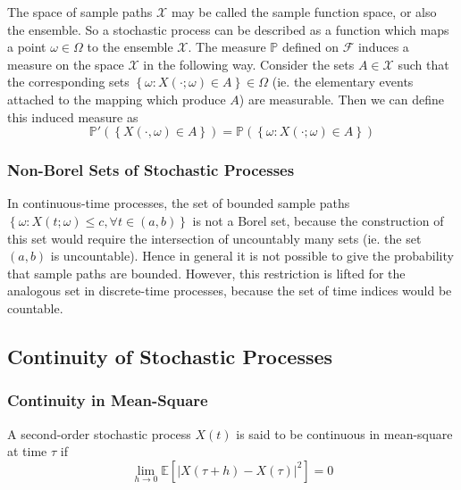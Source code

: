 \documentclass[11pt]{report} %
\begin{document}
The space of sample paths $\mathcal{X}$ may be called the sample function space, or also the ensemble. So a stochastic process can be described as a function which maps a point $\omega \in \Omega$ to the ensemble $\mathcal{X}$. The measure $\mathbb{P}$ defined on $\mathcal{F}$ induces a measure on the space $\mathcal{X}$ in the following way. Consider the sets $A \in \mathcal{X}$ such that the corresponding sets $\left\{\omega: X\left(\cdot; \omega\right) \in A\right\} \in \Omega$ (ie. the elementary events attached to the mapping which produce $A$) are measurable. Then we can define this induced measure as
\begin{equation}
\mathbb{P}'\left(\left\{X\left(\cdot, \omega\right) \in A\right\}\right) = \mathbb{P}\left(\left\{\omega: X\left(\cdot; \omega\right) \in A\right\}\right)
\end{equation}

\subsubsection{Non-Borel Sets of Stochastic Processes}

In continuous-time processes, the set of bounded sample paths $\left\{\omega: X\left(t; \omega\right) \leq c, \forall t\in\left(a, b\right)\right\}$ is not a Borel set, because the construction of this set would require the intersection of uncountably many sets (ie. the set $\left(a, b\right)$ is uncountable). Hence in general it is not possible to give the probability that sample paths are bounded. However, this restriction is lifted for the analogous set in discrete-time processes, because the set of time indices would be countable.

\subsection{Continuity of Stochastic Processes}

\subsubsection{Continuity in Mean-Square}

A second-order stochastic process $X\left(t\right)$ is said to be continuous in mean-square at time $\tau$ if
\begin{equation}
\lim_{h \to 0}\mathbb{E}\left[\left|X\left(\tau + h\right) - X\left(\tau\right)\right|^{2}\right] = 0
\end{equation}
\end{document}
